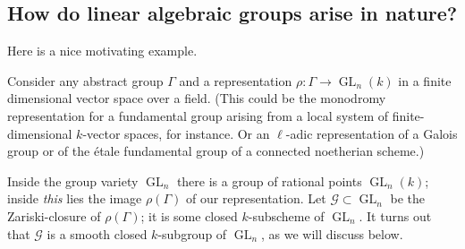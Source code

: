 \documentclass[10pt]{article}
\newcommand{\cG}{\mathcal{G}}
\newcommand{\GL}{\operatorname{GL}}
\renewcommand{\(}{\left(}
\renewcommand{\)}{\right)}
\numberwithin{thm}{subsection}
\begin{document}
\subsection{How do linear algebraic groups arise in nature?}
Here is a nice motivating example.
\begin{ex}\label{repns}
Consider any abstract group $\Gamma$
and a representation $\rho:\Gamma\to\GL_n(k)$ in
a finite dimensional vector space over a field.
(This could be the monodromy representation for
a fundamental group arising from a local system of finite-dimensional
$k$-vector spaces, for instance. Or an $\ell$-adic representation of a Galois
group or of the \'etale fundamental group of a connected noetherian scheme.) 

Inside the group variety $\GL_n$ there is a group of rational points
$\GL_n(k)$; inside \textit{this} lies the image $\rho(\Gamma)$ of
our representation.
Let $\cG\subset\GL_n$ be the Zariski-closure of $\rho(\Gamma)$;
it is some closed $k$-subscheme of $\GL_n$.
It turns out that $\cG$ is a smooth closed $k$-subgroup of $\GL_n$, as we will discuss below. 
\end{ex}
\end{document}
